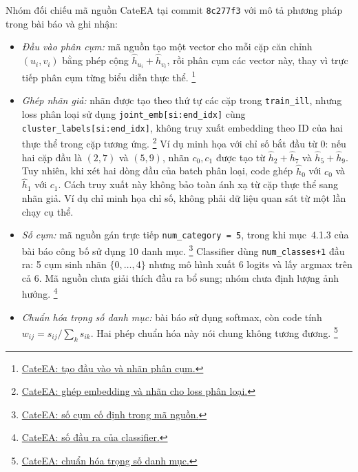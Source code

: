 Nhóm đối chiếu mã nguồn CateEA tại commit
\texttt{8c277f3} với mô tả phương pháp trong bài báo và ghi nhận:
\begin{itemize}
  \item \textit{Đầu vào phân cụm:} mã nguồn tạo một vector cho
  mỗi cặp căn chỉnh $(u_i,v_i)$ bằng phép cộng
  $\hat{h}_{u_i}+\hat{h}_{v_i}$, rồi phân cụm các vector này,
  thay vì trực tiếp phân cụm từng biểu diễn thực thể.
  \footnote{\href{https://github.com/Melkor0007/CateEA/blob/8c277f3292b98f22aaaecb75d01ac44487cefed6/src/myrun.py\#L461-L474}{CateEA: tạo đầu vào và nhãn phân cụm.}}

  \item \textit{Ghép nhãn giả:} nhãn được tạo theo thứ tự các
  cặp trong \texttt{train\_ill}, nhưng loss phân loại sử dụng
  \texttt{joint\_emb[si:end\_idx]} cùng
  \texttt{cluster\_labels[si:end\_idx]}, không truy xuất
  embedding theo ID của hai thực thể trong cặp tương ứng.
  \footnote{\href{https://github.com/Melkor0007/CateEA/blob/8c277f3292b98f22aaaecb75d01ac44487cefed6/src/myrun.py\#L518-L533}{CateEA: ghép embedding và nhãn cho loss phân loại.}}
  Ví dụ minh họa với chỉ số bắt đầu từ 0: nếu hai cặp đầu là
  $(2,7)$ và $(5,9)$, nhãn $c_0,c_1$ được tạo từ
  $\hat{h}_2+\hat{h}_7$ và $\hat{h}_5+\hat{h}_9$.
  Tuy nhiên, khi xét hai dòng đầu của batch phân loại, code
  ghép $\hat{h}_0$ với $c_0$ và $\hat{h}_1$ với $c_1$.
  Cách truy xuất này không bảo toàn ánh xạ từ cặp thực thể
  sang nhãn giả. Ví dụ chỉ minh họa chỉ số, không phải dữ
  liệu quan sát từ một lần chạy cụ thể.

  \item \textit{Số cụm:} mã nguồn gán trực tiếp
  \texttt{num\_category = 5}, trong khi mục~4.1.3 của bài báo
  công bố sử dụng 10 danh mục.
  \footnote{\href{https://github.com/Melkor0007/CateEA/blob/8c277f3292b98f22aaaecb75d01ac44487cefed6/src/myrun.py\#L466-L474}{CateEA: số cụm cố định trong mã nguồn.}}
  Classifier dùng \texttt{num\_classes+1} đầu ra: 5 cụm sinh
  nhãn $\{0,\ldots,4\}$ nhưng mô hình xuất 6 logits và lấy
  argmax trên cả 6. Mã nguồn chưa giải thích đầu ra bổ sung;
  nhóm chưa định lượng ảnh hưởng.
  \footnote{\href{https://github.com/Melkor0007/CateEA/blob/8c277f3292b98f22aaaecb75d01ac44487cefed6/src/clucls.py\#L175-L200}{CateEA: số đầu ra của classifier.}}


  \item \textit{Chuẩn hóa trọng số danh mục:} bài báo sử dụng
  softmax, còn code tính $w_{ij}=s_{ij}/\sum_k s_{ik}$.
  Hai phép chuẩn hóa này nói chung không tương đương.
  \footnote{\href{https://github.com/Melkor0007/CateEA/blob/8c277f3292b98f22aaaecb75d01ac44487cefed6/src/myrun.py\#L774-L782}{CateEA: chuẩn hóa trọng số danh mục.}}


\end{itemize}
